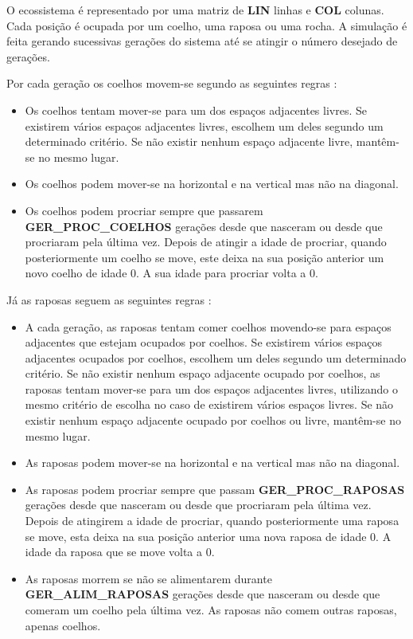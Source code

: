 \documentclass[12pt]{article}
\begin{document}
O ecossistema é representado por uma matriz de \textbf{LIN} linhas e \textbf{COL} colunas.
Cada posição é ocupada por um coelho, uma raposa ou uma rocha.
A simulação é feita gerando sucessivas gerações do sistema até se atingir o número
desejado de gerações.

Por cada geração os coelhos movem-se segundo as seguintes regras \cite{enunciado}:

\begin{itemize}
  \item Os coelhos tentam mover-se para um dos espaços adjacentes livres. Se existirem vários espaços adjacentes livres, escolhem um deles segundo um determinado critério. Se não existir nenhum espaço adjacente livre, mantêm-se no mesmo lugar.
  \item Os coelhos podem mover-se na horizontal e na vertical mas não na diagonal.
  \item Os coelhos podem procriar sempre que passarem \textbf{GER\_PROC\_COELHOS} gerações desde que nasceram ou desde que procriaram pela última vez. Depois de atingir a idade de procriar, quando posteriormente um coelho se move, este deixa na sua posição anterior um novo coelho de idade 0. A sua idade para procriar volta a 0.
\end{itemize}

Já as raposas seguem as seguintes regras \cite{enunciado}:

\begin{itemize}
  \item A cada geração, as raposas tentam comer coelhos movendo-se para espaços adjacentes que estejam ocupados por coelhos. Se existirem vários espaços adjacentes ocupados por coelhos, escolhem um deles segundo um determinado critério. Se não existir nenhum espaço adjacente ocupado por coelhos, as raposas tentam mover-se para um dos espaços adjacentes livres, utilizando o mesmo critério de escolha no caso de existirem vários espaços livres. Se não existir nenhum espaço adjacente ocupado por coelhos ou livre, mantêm-se no mesmo lugar.
  \item As raposas podem mover-se na horizontal e na vertical mas não na diagonal.
  \item As raposas podem procriar sempre que passam \textbf{GER\_PROC\_RAPOSAS} gerações desde que nasceram ou desde que procriaram pela última vez. Depois de atingirem a idade de procriar, quando posteriormente uma raposa se move, esta deixa na sua posição anterior uma nova raposa de idade 0. A idade da raposa que se move volta a 0.
  \item As raposas morrem se não se alimentarem durante \textbf{GER\_ALIM\_RAPOSAS} gerações desde que nasceram ou desde que comeram um coelho pela última vez. As raposas não comem outras raposas, apenas coelhos.
\end{itemize}
\end{document}
